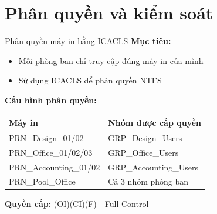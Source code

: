 \documentclass{beamer}
\begin{document}
    \section{Phân quyền và kiểm soát}
    \begin{frame}{Phân quyền máy in bằng ICACLS}
        \textbf{Mục tiêu:}
        \begin{itemize}
            \item Mỗi phòng ban chỉ truy cập đúng máy in của mình
            \item Sử dụng ICACLS để phân quyền NTFS
        \end{itemize}
        
        \vspace{0.3cm}
        \textbf{Cấu hình phân quyền:}
        \begin{table}[ht]
            \centering
            \small
            \begin{tabular}{|l|l|}
            \hline
            \textbf{Máy in} & \textbf{Nhóm được cấp quyền} \\
            \hline
            PRN\_Design\_01/02 & GRP\_Design\_Users \\
            \hline
            PRN\_Office\_01/02/03 & GRP\_Office\_Users \\
            \hline
            PRN\_Accounting\_01/02 & GRP\_Accounting\_Users \\
            \hline
            PRN\_Pool\_Office & Cả 3 nhóm phòng ban \\
            \hline
            \end{tabular}
        \end{table}
        
        \vspace{0.2cm}
        \textbf{Quyền cấp:} (OI)(CI)(F) - Full Control
    \end{frame}
    
\end{document}
